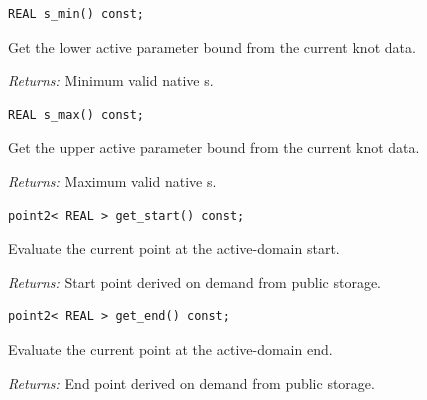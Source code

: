 \par\noindent\begin{minipage}{\linewidth}
\begin{lstlisting}[style=apireference]
REAL s_min() const;
\end{lstlisting}
{\footnotesize Get the lower active parameter bound from the current knot data.\par}
{\footnotesize\textit{Returns:} Minimum valid native s.\par}
\end{minipage}\par\vspace{1pt}
\par\noindent\begin{minipage}{\linewidth}
\begin{lstlisting}[style=apireference]
REAL s_max() const;
\end{lstlisting}
{\footnotesize Get the upper active parameter bound from the current knot data.\par}
{\footnotesize\textit{Returns:} Maximum valid native s.\par}
\end{minipage}\par\vspace{1pt}
\par\noindent\begin{minipage}{\linewidth}
\begin{lstlisting}[style=apireference]
point2< REAL > get_start() const;
\end{lstlisting}
{\footnotesize Evaluate the current point at the active-domain start.\par}
{\footnotesize\textit{Returns:} Start point derived on demand from public storage.\par}
\end{minipage}\par\vspace{1pt}
\par\noindent\begin{minipage}{\linewidth}
\begin{lstlisting}[style=apireference]
point2< REAL > get_end() const;
\end{lstlisting}
{\footnotesize Evaluate the current point at the active-domain end.\par}
{\footnotesize\textit{Returns:} End point derived on demand from public storage.\par}
\end{minipage}\par\vspace{1pt}
